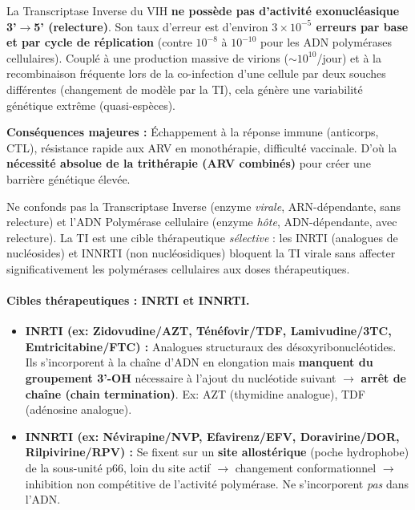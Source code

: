 \documentclass[11pt]{article}
\newcommand{\cle}[1]{{\popxbold\color{popdark}#1}}
\begin{document}
\begin{propriete}
La Transcriptase Inverse du VIH \textbf{ne possède pas d'activité exonucléasique 3'$\to$5' (relecture)}. Son taux d'erreur est d'environ \textbf{$3 \times 10^{-5}$ erreurs par base et par cycle de réplication} (contre $10^{-8}$ à $10^{-10}$ pour les ADN polymérases cellulaires). Couplé à une production massive de virions ($\sim 10^{10}$/jour) et à la \cle{recombinaison} fréquente lors de la co-infection d'une cellule par deux souches différentes (changement de modèle par la TI), cela génère une \cle{variabilité génétique extrême} (quasi-espèces).
\par \textbf{Conséquences majeures :} Échappement à la réponse immune (anticorps, CTL), résistance rapide aux ARV en monothérapie, difficulté vaccinale. D'où la \textbf{nécessité absolue de la trithérapie (ARV combinés)} pour créer une barrière génétique élevée.
\end{propriete}

\begin{attention}
Ne confonds pas la Transcriptase Inverse (enzyme \emph{virale}, ARN-dépendante, sans relecture) et l'ADN Polymérase cellulaire (enzyme \emph{hôte}, ADN-dépendante, avec relecture). La TI est une cible thérapeutique \emph{sélective} : les INRTI (analogues de nucléosides) et INNRTI (non nucléosidiques) bloquent la TI virale sans affecter significativement les polymérases cellulaires aux doses thérapeutiques.
\end{attention}

\paragraph{Cibles thérapeutiques : INRTI et INNRTI.}
\begin{itemize}
    \item \textbf{INRTI (ex: Zidovudine/AZT, Ténéfovir/TDF, Lamivudine/3TC, Emtricitabine/FTC) :} Analogues structuraux des désoxyribonucléotides. Ils s'incorporent à la chaîne d'ADN en elongation mais \textbf{manquent du groupement 3'-OH} nécessaire à l'ajout du nucléotide suivant $\to$ \textbf{arrêt de chaîne (chain termination)}. Ex: AZT (thymidine analogue), TDF (adénosine analogue).
    \item \textbf{INNRTI (ex: Névirapine/NVP, Efavirenz/EFV, Doravirine/DOR, Rilpivirine/RPV) :} Se fixent sur un \textbf{site allostérique} (poche hydrophobe) de la sous-unité p66, loin du site actif $\to$ changement conformationnel $\to$ inhibition non compétitive de l'activité polymérase. Ne s'incorporent \emph{pas} dans l'ADN.
\end{itemize}
\end{document}
